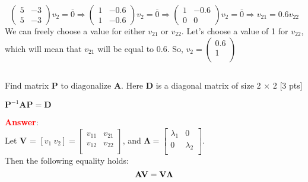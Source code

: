 \documentclass{homework}
\begin{document}
    \begin{equation*}
    \left(\begin{matrix}
        5 & -3 \\
        5  & -3
        \end{matrix}\right)v_2 = \overline{0} \Rightarrow
        \left(\begin{matrix}
        1 & -0.6 \\
        1  & -0.6
        \end{matrix}\right)v_2 = \overline{0} \Rightarrow
        \left(\begin{matrix}
        1 & -0.6 \\
        0  & 0
        \end{matrix}\right)v_2 = \overline{0} \Rightarrow
        v_{21} = 0.6v_{22}
    \end{equation*}
    We can freely choose a value for either $v_{21}$ or $v_{22}$. Let's choose a value of 1 for $v_{22}$, which will mean that $v_{21}$ will be equal to 0.6. So, $v_2 = \left(\begin{matrix}
    0.6 \\
    1 \\
    \end{matrix}\right)$
    
    
    \subsection{}
	Find matrix \textbf{P} to diagonalize \textbf{A}. Here \textbf{D} is a diagonal matrix of size 2 × 2  [3 pts]
	\begin{center}
		$\textbf{P}^{-1}\textbf{A}\textbf{P} = \textbf{D}$
	\end{center}
	\textbf{\textcolor{red}{Answer}}: \\
	
	Let \textbf{V} = $\left[v_1 \ v_2\right] = \left[\begin{matrix}
	v_{11} & v_{21} \\
	v_{12} & v_{22} \\
	\end{matrix}\right]$, and $\mathbf{\Lambda} = \left[\begin{matrix}
	\lambda_1 & 0 \\
	0 & \lambda_2 \\
	\end{matrix}
	\right]$. \\
	
	Then the following equality holds:
	\begin{equation}
	    \text{\textbf{AV}} = \text{\textbf{V}}\mathbf{\Lambda} 
	\end{equation}
	
\end{document}
